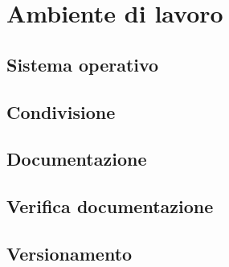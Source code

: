 \section{Ambiente di lavoro}
	\subsection{Sistema operativo}
	\subsection{Condivisione}
	\subsection{Documentazione}
	\subsection{Verifica documentazione}
	\subsection{Versionamento}